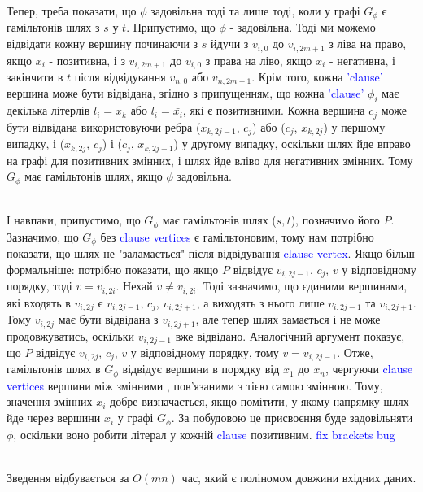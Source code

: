 \documentclass[14pt]{article}
\begin{document}
\begin{spacing}{1.175}
    \quad Тепер, треба показати, що \(\phi\) задовільна тоді та лише тоді, коли у графі \(G_{\phi}\) є гамільтонів шлях з \(s\) у \(t\). Припустимо, що \(\phi\) - задовільна. Тоді ми можемо відвідати кожну вершину починаючи з \(s\) йдучи з \(v_{i,0}\) до \(v_{i,2m+1}\) з ліва на право, якщо \(x_i\) - позитивна, і з \(v_{i,2m+1}\) до \(v_{i,0}\) з права на ліво, якщо \(x_i\) - негативна, і закінчити в \(t\) після відвідування \(v_{n,0}\) або \(v_{n,2m+1}\). Крім того, кожна \textcolor{blue}{'clause'} вершина може бути відвідана, згідно з припущенням, що кожна \textcolor{blue}{'clause'} \(\phi_{i}\) має декілька літерлів \(l_i = x_k\) або \(l_i = \bar{x_i}\), які є позитивними. Кожна вершина \(c_j\) може бути відвідана використовуючи ребра (\(x_{k,2j-1}\), \(c_{j}\)) або (\(c_{j}\), \(x_{k,2j}\)) у першому випадку, і (\(x_{k,2j}\), \(c_{j}\)) і (\(c_{j}\), \(x_{k,2j-1}\)) у другому випадку, оскільки шлях йде вправо на графі для позитивних змінних, і шлях йде вліво для негативних змінних. Тому \(G_{\phi}\) має гамільтонів шлях, якщо \(\phi\) задовільна.
    
    \\
    \quad І навпаки, припустимо, що \(G_{\phi}\) має гамільтонів шлях (\(s, t\)), позначимо його \(P\). Зазначимо, що \(G_{\phi}\) без \textcolor{blue}{clause vertices}  є гамільтоновим, тому нам потрібно показати, що шлях не "заламається" після відвідування \textcolor{blue}{clause vertex}. Якщо більш формальніше: потрібно показати, що якщо \(P\) відвідує \(v_{i, 2j-1}\), \(c_j\), \(v\) у відповідному порядку, тоді \(v = v_{i,2i}\). Нехай \(v \neq v_{i,2i}\). Тоді зазначимо, що єдиними вершинами, які входять в \(v_{i,2j}\) є \(v_{i,2j-1}\), \(c_j\), \(v_{i,2j+1}\), а виходять з нього лише \(v_{i,2j-1}\) та \(v_{i,2j+1}\). Тому \(v_{i,2j}\) має бути відвідана з \(v_{i,2j+1}\), але тепер шлях замається і не може продовжуватись, оскільки \(v_{i,2j-1}\) вже відвідано. Аналогічний аргумент показує, що \(P\) відвідує \(v_{i, 2j}\), \(c_j\), \(v\) у відповідному порядку, тому \(v = v_{i,2j-1}\). Отже, гамільтонів шлях в \(G_{\phi}\) відвідує вершини в порядку від \(x_1\) до \(x_n\), чергуючи \textcolor{blue}{clause vertices} вершини між змінними , пов'язаними з тією самою змінною. Тому, значення змінних \(x_i\) добре визначається, якщо помітити, у якому напрямку шлях йде через вершини \(x_i\) у графі \(G_{\phi}\). За побудовою це присвоєння буде задовільняти \(\phi\), оскільки воно робити літерал у кожній \textcolor{blue}{clause} позитивним. \textcolor{blue}{fix brackets bug}
    
    \\
    \quad Зведення відбувається за \(O(mn)\) час, який є поліномом довжини вхідних даних.
    \\



\end{spacing}
\end{document}
